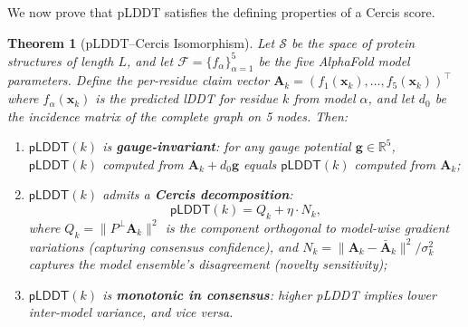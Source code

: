 \documentclass[12pt,a4paper]{article}
\newtheorem{theorem}{Theorem}[section]
\theoremstyle{remark}
\newcommand{\R}{\mathbb{R}}
\newcommand{\F}{\mathcal{F}}
\newcommand{\Sstruct}{\mathcal{S}}
\newcommand{\pLDDT}{\textsf{pLDDT}}
\begin{document}
We now prove that \pLDDT{} satisfies the defining properties of a Cercis score.

\begin{theorem}[pLDDT--Cercis Isomorphism]
\label{thm:plddt-cercis}
Let $\Sstruct$ be the space of protein structures of length $L$, and let $\F = \{f_\alpha\}_{\alpha=1}^{5}$ be the five AlphaFold model parameters.
Define the per-residue claim vector $\mathbf{A}_k = (f_1(\mathbf{x}_k), \dots, f_5(\mathbf{x}_k))^\top$ where $f_\alpha(\mathbf{x}_k)$ is the predicted lDDT for residue $k$ from model $\alpha$, and let $d_0$ be the incidence matrix of the complete graph on 5 nodes.
Then:
\begin{enumerate}[leftmargin=*,label=(\roman*)]
    \item $\pLDDT(k)$ is \textbf{gauge-invariant}: for any gauge potential $\mathbf{g} \in \R^5$, $\pLDDT(k)$ computed from $\mathbf{A}_k + d_0 \mathbf{g}$ equals $\pLDDT(k)$ computed from $\mathbf{A}_k$;
    \item $\pLDDT(k)$ admits a \textbf{Cercis decomposition}:
    \begin{equation}
        \pLDDT(k) = Q_k + \eta \cdot N_k,
    \end{equation}
    where $Q_k = \|P^\perp \mathbf{A}_k\|^2$ is the component orthogonal to model-wise gradient variations (capturing consensus confidence), and $N_k = \|\mathbf{A}_k - \bar{\mathbf{A}}_k\|^2 / \sigma_k^2$ captures the model ensemble's disagreement (novelty sensitivity);
    \item $\pLDDT(k)$ is \textbf{monotonic in consensus}: higher pLDDT implies lower inter-model variance, and vice versa.
\end{enumerate}
\end{theorem}
\end{document}
